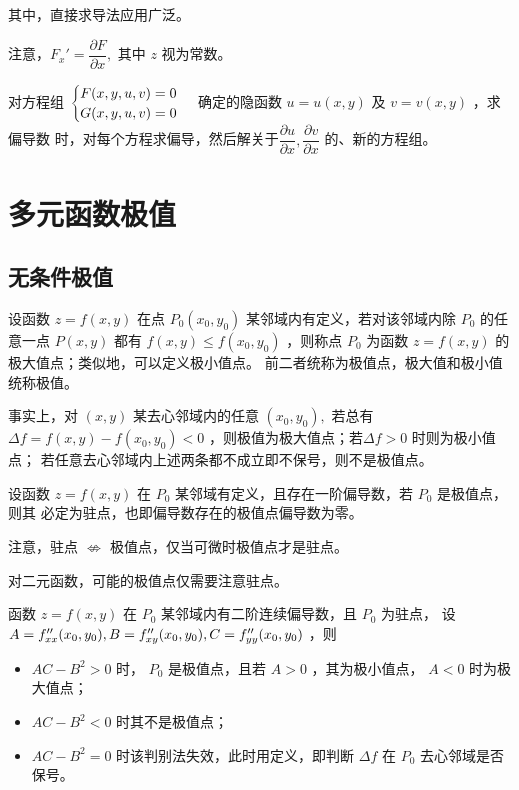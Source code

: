 其中，直接求导法应用广泛。

注意，$ F_x' = \dfrac{\partial F}{\partial x}, $ 其中 $ z $ 视为常数。

对方程组 $ \displaystyle \begin{cases}
    F(x,y,u,v) = 0 \\ G(x,y,u,v) = 0
\end{cases} $ 确定的隐函数 $ u = u(x,y) $ 及 $ v = v(x,y) $ ，求偏导数
时，对每个方程求偏导，然后解关于$ \dfrac{\partial u}{\partial x},\dfrac{\partial v}{\partial x} $ 的、新的方程组。


\section{多元函数极值}

\subsection{无条件极值}

\begin{Def}[无条件极值]
    
    设函数 $ z = f(x,y) $ 在点 $ P_0(x_0,y_0) $ 某邻域内有定义，若对该邻域内除 $ P_0 $ 的任意一点 $ P(x,y) $ 
    都有 $ f(x,y)\leq f(x_0,y_0) $ ，则称点 $ P_0 $ 为函数 $ z = f(x,y) $ 的极大值点；类似地，可以定义极小值点。
    前二者统称为极值点，极大值和极小值统称极值。
\end{Def}

事实上，对 $ (x,y) $ 某去心邻域内的任意 $ (x_0,y_0), $ 
若总有 $ \Delta f = f(x,y) - f(x_0,y_0) < 0 $ ，则极值为极大值点；若$ \Delta f > 0 $ 时则为极小值点；
若任意去心邻域内上述两条都不成立即不保号，则不是极值点。
    
\begin{Theo}[二元函数极值存在的必要条件]

    设函数 $ z = f(x,y) $ 在 $ P_0 $ 某邻域有定义，且存在一阶偏导数，若 $ P_0 $ 是极值点，则其
    必定为驻点，也即偏导数存在的极值点偏导数为零。
\end{Theo}

注意，驻点 $ \nLeftrightarrow $ 极值点，仅当可微时极值点才是驻点。

对二元函数，可能的极值点仅需要注意驻点。

\begin{Theo}[二元函数极值存在的充分条件]

    函数 $ z = f(x,y) $ 在 $ P_0 $ 某邻域内有二阶连续偏导数，且 $ P_0 $ 为驻点，
    设 $ A = f^{\prime\prime}_{xx}(x_0,y_0),B = f^{\prime\prime}_{xy}(x_0,y_0),C = f^{\prime\prime}_{yy}(x_0,y_0) $ ，则
    \begin{itemize}
        \item $ AC - B^2 > 0 $ 时， $ P_0 $ 是极值点，且若 $ A>0 $ ，其为极小值点，
        $ A<0 $ 时为极大值点；
        \item $ AC-B^2<0 $ 时其不是极值点；
        \item $ AC-B^2 = 0 $ 时该判别法失效，此时用定义，即判断 $ \Delta f $ 在
        $ P_0 $ 去心邻域是否保号。
    \end{itemize}
\end{Theo}

